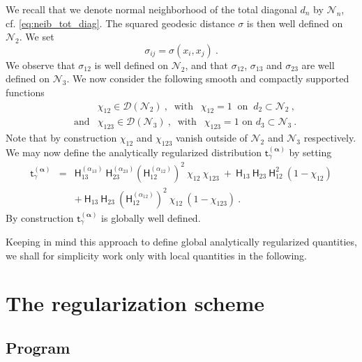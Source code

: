 \documentclass[11pt]{book}
\newcommand{\alphabd}{\boldsymbol{\alpha}}
\newcommand{\Dcal}{\mathcal{D}}
\newcommand{\Ncal}{\mathcal{N}}
\newcommand{\Hsf}{\mathsf{H}}
\newcommand{\tsf}{\mathsf{t}}
\theoremstyle{break}
\begin{document}
We recall that we denote normal neighborhood of the total diagonal $d_n$ by $\Ncal_n$, cf. \eqref{eq:neib_tot_diag}. The squared geodesic distance $\sigma$ is then well defined on $\mathcal{N}_{2}$. We set 
%
\begin{equation*}
\sigma_{ij} = \sigma(x_i,x_j) \ .
\end{equation*}
%
We observe that $\sigma_{12}$ is well defined on $\Ncal_{2}$, and that $\sigma_{12}$, $\sigma_{13}$ and $\sigma_{23}$ are well defined on $\Ncal_{3}$. We now consider the following smooth and compactly supported functions
%
\begin{eqnarray*}
&& \chi_{12} \in \Dcal(\Ncal_{2}) \ , \ \mbox{ with } \ \ \chi_{12} = 1 \ \mbox{ on } \ d_2 \subset \Ncal_{2} \ , \\[6pt]
&\mbox{and}& \chi_{123} \in \Dcal(\Ncal_{3}) \ , \ \mbox{ with } \ \ \chi_{123} = 1 \mbox{ on } d_3 \subset \Ncal_{3} \ . 
\end{eqnarray*}
%
Note that by construction $\chi_{12}$ and $\chi_{123}$ vanish outside of $\Ncal_{2}$ and $\Ncal_{3}$ respectively. We may now define the analytically regularized distribution $\tsf^{(\alphabd)}_\gamma$ by setting
%
\begin{eqnarray}
\tsf^{(\alphabd)}_\gamma &=& \Hsf^{(\alpha_{13})}_{13} \ \Hsf^{(\alpha_{23})}_{23} \left(\Hsf^{(\alpha_{12})}_{12}\right)^2 \ \chi_{12} \ \chi_{123} \ + \ \Hsf_{13} \ \Hsf_{23} \ \Hsf_{12}^2 \ (1-\chi_{12}) \nonumber \\[3pt]
&& + \ \Hsf_{13} \ \Hsf_{23} \ \left(\Hsf^{(\alpha_{12})}_{12}\right)^2 \ \chi_{12} \ (1-\chi_{123}) \ .
\label{eq:kernel_reg_glob}
\end{eqnarray}
%
By construction $\tsf^{(\alphabd)}_\gamma$ is globally well defined.


Keeping in mind this approach to define global analytically regularized quantities, we shall for simplicity work only with local quantities in the following.


\section{The regularization scheme}


\subsection{Program}
\label{p:PROGRAM}
\end{document}
